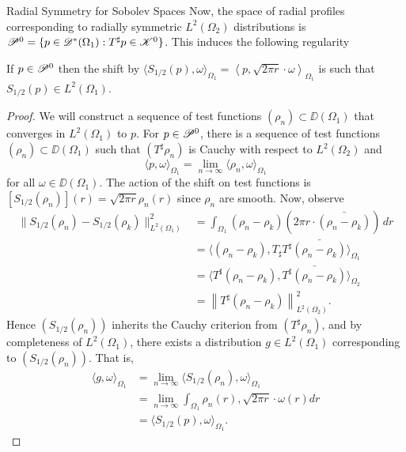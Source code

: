 \begin{chapter}{Radial Symmetry for Sobolev Spaces}
Now, the space of radial profiles corresponding to radially symmetric $L^2(\Omega_2)$ distributions is $\mathscr P^0 = \{p \in \mathscr D^*(\Omega_1): T^\sharp p \in \mathscr K^0\}$.
This induces the following regularity 
\begin{prop} \label{prop:radialL2}
  If $p \in \mathscr P^0$ then the shift by $\langle S_{1/2}(p),\omega\rangle_{\Omega_1} = \left\langle p, \sqrt{2\pi r}\cdot \omega\right\rangle_{\Omega_1}$ is such that $S_{1/2}(p) \in L^2(\Omega_1)$.
\end{prop}
\begin{proof}
  We will construct a sequence of test functions $(\rho_n) \subset \DD(\Omega_1)$ that converges in $L^2(\Omega_1)$ to $p$.
For $p\in \mathscr P^0$, there is a sequence of test functions $(\rho_n)\subset \DD(\Omega_1)$ such that $(T^\sharp \rho_n)$ is Cauchy with respect to $L^2(\Omega_2)$ and
\begin{equation}
  \langle p,\omega\rangle_{\Omega_1} = \lim_{n\to\infty}\langle \rho_n, \omega\rangle_{\Omega_1}
\end{equation}
for all $\omega\in \DD(\Omega_1)$.
The action of the shift on test functions is $[S_{1/2}(\rho_n)](r) = \sqrt{2\pi r}\rho_n(r)$ since $\rho_n$ are smooth.
Now, observe
\begin{align}
  \|S_{1/2}(\rho_n) - S_{1/2}(\rho_k)\|_{L^2(\Omega_1)}^2 
  &= \int_{\Omega_1} (\rho_n - \rho_k)\left(2\pi r\cdot \bar{(\rho_n - \rho_k)}\right) \,dr \nonumber\\
  &= \Big\langle (\rho_n - \rho_k),T_\sharp T^\sharp\bar{(\rho_n - \rho_k)} \Big\rangle_{\Omega_1} \nonumber\\
  &= \Big\langle T^\sharp (\rho_n - \rho_k),\bar{T^\sharp(\rho_n - \rho_k)} \Big\rangle_{\Omega_2} \nonumber\\
  &= \left\| T^\sharp (\rho_n - \rho_k)\right\|_{L^2(\Omega_2)}^2. \label{eq:isometry}
\end{align}
Hence $\left(S_{1/2}(\rho_n)\right)$ inherits the Cauchy criterion from $(T^\sharp\rho_n)$, and by completeness of $L^2(\Omega_1)$, there exists a distribution $g \in L^2(\Omega_1)$ corresponding to $\left(S_{1/2}(\rho_n)\right)$. 
That is,
\begin{align}
  \Big\langle g,\omega\Big\rangle_{\Omega_1} 
    &= \lim_{n\to \infty} \Big\langle S_{1/2}(\rho_n),\omega\Big\rangle_{\Omega_1}\nonumber \\
    &= \lim_{n\to \infty} \int_{\Omega_1} \rho_n(r),\sqrt{2\pi r}\cdot \omega(r)dr \nonumber\\
    &= \Big\langle S_{1/2}(p),\omega\Big\rangle_{\Omega_1}.

\end{align}
\end{proof}
\end{chapter}
